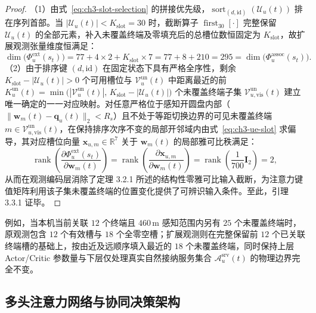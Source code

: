 \begin{proof}
（1）由式~\eqref{eq:ch3-slot-selection} 的拼接优先级，$\operatorname{sort}_{(d,\mathrm{id})}(\mathcal{U}_u(t))$ 排在序列首部。当 $|\mathcal{U}_u(t)|<K_{\mathrm{slot}}=30$ 时，截断算子 $\operatorname{first}_{30}[\cdot]$ 完整保留 $\mathcal{U}_u(t)$ 的全部元素，补入未覆盖终端及零填充后的总槽位数恒固定为 $K_{\mathrm{slot}}$，故扩展观测张量维度恒满足：
\begin{equation*}
    \dim\big(\Phi_u^{\mathrm{ext}}(s_t)\big)=77+4\times 2+K_{\mathrm{slot}}\times 7=77+8+210=295=\dim\big(\Phi_u^{\mathrm{assoc}}(s_t)\big).
\end{equation*}
（2）由于排序键 $(d,\mathrm{id})$ 在固定状态下具有严格全序性，剩余 $K_{\mathrm{slot}}-|\mathcal{U}_u(t)|>0$ 个可用槽位与 $\mathcal{V}_u^{\mathrm{un}}(t)$ 中距离最近的前 $K_u^{\mathrm{un}}(t)=\min\big(|\mathcal{V}_u^{\mathrm{un}}(t)|,\,K_{\mathrm{slot}}-|\mathcal{U}_u(t)|\big)$ 个未覆盖终端子集 $\mathcal{V}_{u,\mathrm{vis}}^{\mathrm{un}}(t)$ 建立唯一确定的一一对应映射。对任意严格位于感知开圆盘内部（$\|\mathbf{w}_m(t)-\mathbf{q}_u(t)\|_2<R_s$）且不处于等距切换边界的可见未覆盖终端 $m\in\mathcal{V}_{u,\mathrm{vis}}^{\mathrm{un}}(t)$，在保持排序次序不变的局部开邻域内由式~\eqref{eq:ch3-ue-slot} 求偏导，其对应槽位向量 $\mathbf{x}_{u,m}\in\mathbb{R}^7$ 关于 $\mathbf{w}_m(t)$ 的局部雅可比秩满足：
\begin{equation*}
    \operatorname{rank}\!\left(\frac{\partial\Phi_u^{\mathrm{ext}}(s_t)}{\partial\mathbf{w}_m(t)}\right)
    =\operatorname{rank}\!\left(\frac{\partial\mathbf{x}_{u,m}}{\partial\mathbf{w}_m(t)}\right)
    =\operatorname{rank}\!\left(\frac{1}{700}\mathbf{I}_2\right)=2,
\end{equation*}
从而在观测编码层消除了定理 3.2.1 所述的结构性零雅可比输入截断，为注意力键值矩阵利用该子集未覆盖终端的位置变化提供了可辨识输入条件。至此，引理 3.3.1 证毕。
\end{proof}

例如，当本机当前关联 $12$ 个终端且 $460\,\mathrm{m}$ 感知范围内另有 $25$ 个未覆盖终端时，原观测包含 $12$ 个有效槽与 $18$ 个全零空槽；扩展观测则在完整保留前 $12$ 个已关联终端槽的基础上，按由近及远顺序填入最近的 $18$ 个未覆盖终端，同时保持上层 Actor/Critic 参数量与下层仅处理真实自然接纳服务集合 $\mathcal{A}_u^{\mathrm{srv}}(t)$ 的物理边界完全不变。

\subsection{多头注意力网络与协同决策架构}
\label{sec:attention-mappo}
\label{sec:attention-structure}

